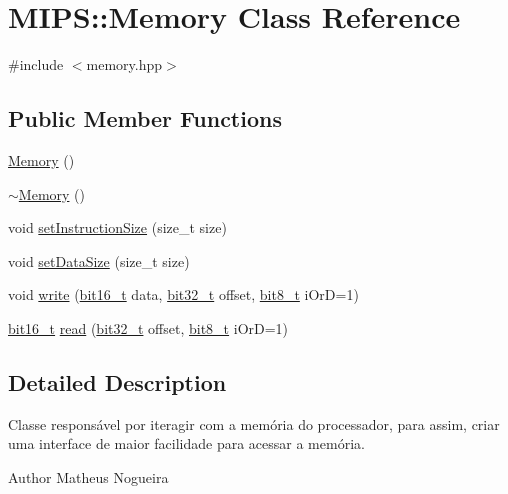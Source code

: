 \hypertarget{classMIPS_1_1Memory}{}\section{M\+I\+PS\+:\+:Memory Class Reference}
\label{classMIPS_1_1Memory}


{\ttfamily \#include $<$memory.\+hpp$>$}

\subsection*{Public Member Functions}
\begin{DoxyCompactItemize}
\item 
\hyperlink{classMIPS_1_1Memory_abac2c5ab745d4b2e0320a020cd2b77f6}{Memory} ()
\item 
\hyperlink{classMIPS_1_1Memory_ace3e886fa42efa3e629c7572bf232e05}{$\sim$\+Memory} ()
\item 
void \hyperlink{classMIPS_1_1Memory_a636e0ca3d23fc5022a2a4b59a6648210}{set\+Instruction\+Size} (size\+\_\+t size)
\item 
void \hyperlink{classMIPS_1_1Memory_a53b03b417ee8efb4a6f3a0020c3bd7ab}{set\+Data\+Size} (size\+\_\+t size)
\item 
void \hyperlink{classMIPS_1_1Memory_a8d339b30f29c4dc8044b51c982d5e95b}{write} (\hyperlink{core_8hpp_adc265a970bc35995b5879784bbb3f1b7}{bit16\+\_\+t} data, \hyperlink{core_8hpp_ad5f4c6ca614f67be232930e0e31b9ccc}{bit32\+\_\+t} offset, \hyperlink{core_8hpp_a6074bae122ae7b527864eec42c728c3c}{bit8\+\_\+t} i\+OrD=1)
\item 
\hyperlink{core_8hpp_adc265a970bc35995b5879784bbb3f1b7}{bit16\+\_\+t} \hyperlink{classMIPS_1_1Memory_a93a2aecd6026ecd86e77fcef6b99b91b}{read} (\hyperlink{core_8hpp_ad5f4c6ca614f67be232930e0e31b9ccc}{bit32\+\_\+t} offset, \hyperlink{core_8hpp_a6074bae122ae7b527864eec42c728c3c}{bit8\+\_\+t} i\+OrD=1)
\end{DoxyCompactItemize}


\subsection{Detailed Description}
Classe responsável por iteragir com a memória do processador, para assim, criar uma interface de maior facilidade para acessar a memória.

\begin{DoxyAuthor}{Author}
Matheus Nogueira 
\end{DoxyAuthor}


